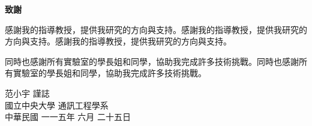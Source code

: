 \begin{center}
	\LARGE {\textbf{致謝}}
\end{center}

\bigskip  %
感謝我的指導教授，提供我研究的方向與支持。感謝我的指導教授，提供我研究的方向與支持。感謝我的指導教授，提供我研究的方向與支持。

\bigskip %
同時也感謝所有實驗室的學長姐和同學，協助我完成許多技術挑戰。同時也感謝所有實驗室的學長姐和同學，協助我完成許多技術挑戰。

\vspace{3em}

\begin{flushright}
范小宇 \qquad 謹誌 \\
國立中央大學 \quad 通訊工程學系\\
中華民國 \quad 一一五年 六月 二十五日
\end{flushright}